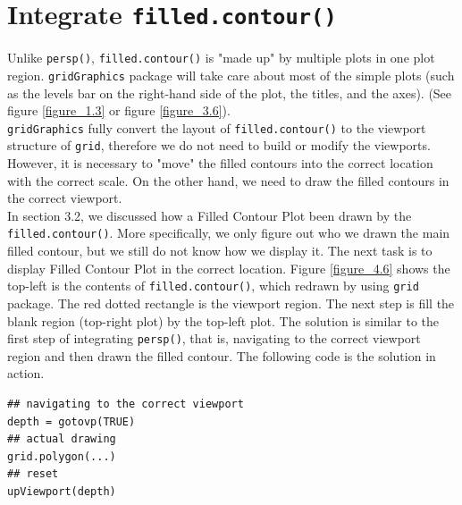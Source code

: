 \documentclass[paper=a4, fontsize=11pt]{report}
\begin{document}
\section{Integrate \texttt{filled.contour()}}
Unlike \texttt{persp()}, \texttt{filled.contour()} is "made up" by multiple plots in one plot region. \texttt{gridGraphics} package will take care about most of the simple plots (such as the levels bar on the right-hand side of the plot, the titles, and the axes). (See figure \ref{figure_1.3} or figure \ref{figure_3.6}).\\
\texttt{gridGraphics} fully convert the layout of \texttt{filled.contour()} to the viewport structure of \texttt{grid}, therefore we do not need to build or modify the viewports. However, it is necessary to "move" the filled contours into the correct location with the correct scale. On the other hand, we need to draw the filled contours in the correct viewport.\\
In section 3.2, we discussed how a Filled Contour Plot been drawn by the \texttt{filled.contour()}. More specifically, we only figure out who we drawn the main filled contour, but we still do not know how we display it. The next task is to display Filled Contour Plot in the correct location. Figure \ref{figure_4.6} shows the top-left is the contents of \texttt{filled.contour()}, which redrawn by using \texttt{grid} package. The red dotted rectangle is the viewport region. The next step is fill the blank region (top-right plot) by the top-left plot. The solution is similar to the first step of integrating \texttt{persp()}, that is, navigating to the correct viewport region and then drawn the filled contour. The following code is the solution in action.
\begin{lstlisting}
## navigating to the correct viewport
depth = gotovp(TRUE)
## actual drawing
grid.polygon(...)
## reset
upViewport(depth)
\end{lstlisting}
\end{document}
